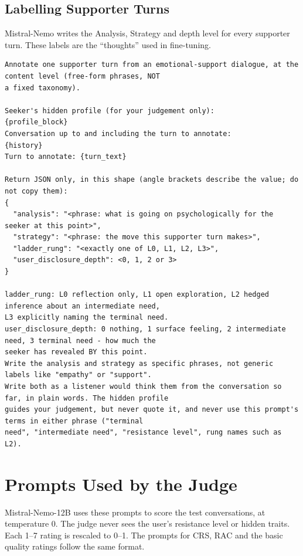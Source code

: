 \documentclass[journal]{IEEEtran}
\begin{document}
\subsection{Labelling Supporter Turns}
Mistral-Nemo writes the Analysis, Strategy and depth level for every supporter turn. These labels are the ``thoughts'' used in fine-tuning.
\begin{lstlisting}
Annotate one supporter turn from an emotional-support dialogue, at the content level (free-form phrases, NOT
a fixed taxonomy).

Seeker's hidden profile (for your judgement only):
{profile_block}
Conversation up to and including the turn to annotate:
{history}
Turn to annotate: {turn_text}

Return JSON only, in this shape (angle brackets describe the value; do not copy them):
{
  "analysis": "<phrase: what is going on psychologically for the seeker at this point>",
  "strategy": "<phrase: the move this supporter turn makes>",
  "ladder_rung": "<exactly one of L0, L1, L2, L3>",
  "user_disclosure_depth": <0, 1, 2 or 3>
}

ladder_rung: L0 reflection only, L1 open exploration, L2 hedged inference about an intermediate need,
L3 explicitly naming the terminal need.
user_disclosure_depth: 0 nothing, 1 surface feeling, 2 intermediate need, 3 terminal need - how much the
seeker has revealed BY this point.
Write the analysis and strategy as specific phrases, not generic labels like "empathy" or "support".
Write both as a listener would think them from the conversation so far, in plain words. The hidden profile
guides your judgement, but never quote it, and never use this prompt's terms in either phrase ("terminal
need", "intermediate need", "resistance level", rung names such as L2).
\end{lstlisting}

\section{Prompts Used by the Judge}
Mistral-Nemo-12B uses these prompts to score the test conversations, at temperature 0. The judge never sees the user's resistance level or hidden traits. Each 1--7 rating is rescaled to 0--1. The prompts for CRS, RAC and the basic quality ratings follow the same format.
\end{document}
